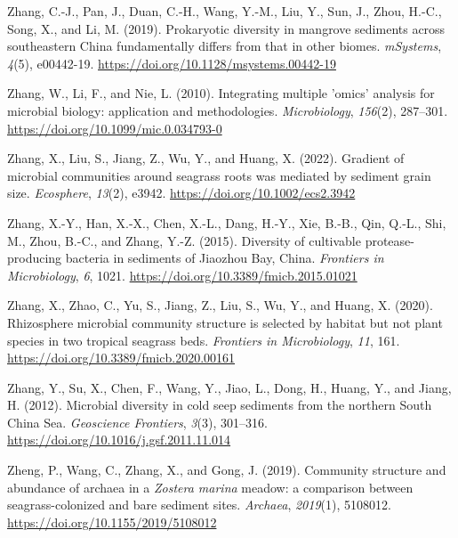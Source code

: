 \documentclass[
  12 pt,
]{book}
\newlength{\cslhangindent}
\newlength{\cslentryspacingunit} %
\newenvironment{CSLReferences}[2] %
 {%
  \setlength{\parindent}{0pt}
  \ifodd #1
  \let\oldpar\par
  \def\par{\hangindent=\cslhangindent\oldpar}
  \fi
  \setlength{\parskip}{#2\cslentryspacingunit}
 }%
 {}
\begin{document}
\begin{CSLReferences}{1}{0}
\leavevmode{}%
Zhang, C.-J., Pan, J., Duan, C.-H., Wang, Y.-M., Liu, Y., Sun, J., Zhou, H.-C., Song, X., and Li, M. (2019). Prokaryotic diversity in mangrove sediments across southeastern {China} fundamentally differs from that in other biomes. \emph{mSystems}, \emph{4}(5), e00442-19. \url{https://doi.org/10.1128/msystems.00442-19}

\leavevmode{}%
Zhang, W., Li, F., and Nie, L. (2010). Integrating multiple 'omics' analysis for microbial biology: application and methodologies. \emph{Microbiology}, \emph{156}(2), 287--301. \url{https://doi.org/10.1099/mic.0.034793-0}

\leavevmode{}%
Zhang, X., Liu, S., Jiang, Z., Wu, Y., and Huang, X. (2022). Gradient of microbial communities around seagrass roots was mediated by sediment grain size. \emph{Ecosphere}, \emph{13}(2), e3942. \url{https://doi.org/10.1002/ecs2.3942}

\leavevmode{}%
Zhang, X.-Y., Han, X.-X., Chen, X.-L., Dang, H.-Y., Xie, B.-B., Qin, Q.-L., Shi, M., Zhou, B.-C., and Zhang, Y.-Z. (2015). Diversity of cultivable protease-producing bacteria in sediments of {Jiaozhou Bay}, {China}. \emph{Frontiers in Microbiology}, \emph{6}, 1021. \url{https://doi.org/10.3389/fmicb.2015.01021}

\leavevmode{}%
Zhang, X., Zhao, C., Yu, S., Jiang, Z., Liu, S., Wu, Y., and Huang, X. (2020). Rhizosphere microbial community structure is selected by habitat but not plant species in two tropical seagrass beds. \emph{Frontiers in Microbiology}, \emph{11}, 161. \url{https://doi.org/10.3389/fmicb.2020.00161}

\leavevmode{}%
Zhang, Y., Su, X., Chen, F., Wang, Y., Jiao, L., Dong, H., Huang, Y., and Jiang, H. (2012). Microbial diversity in cold seep sediments from the northern {South China Sea}. \emph{Geoscience Frontiers}, \emph{3}(3), 301--316. \url{https://doi.org/10.1016/j.gsf.2011.11.014}

\leavevmode{}%
Zheng, P., Wang, C., Zhang, X., and Gong, J. (2019). Community structure and abundance of archaea in a {{\emph{Zostera marina}}} meadow: a comparison between seagrass-colonized and bare sediment sites. \emph{Archaea}, \emph{2019}(1), 5108012. \url{https://doi.org/10.1155/2019/5108012}


\end{CSLReferences}
\end{document}

